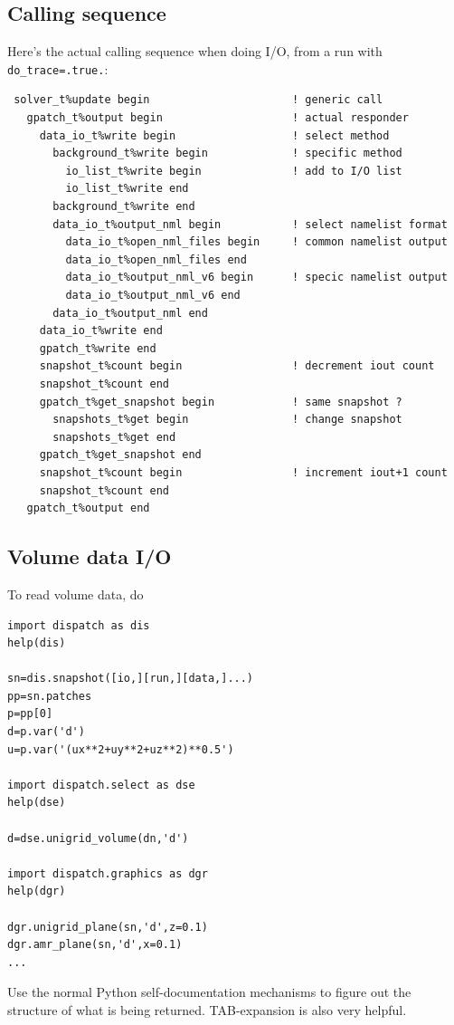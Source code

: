 \documentclass[paper=a4,fontsize=11pt]{scrartcl}
\numberwithin{equation}{section}		%
\numberwithin{figure}{section}			%
\numberwithin{table}{section}				%
\newcommand{\codecolor}{\color{Blue}}
\begin{document}
\subsection{Calling sequence}
Here's the actual calling sequence when doing I/O, from a run with \verb|do_trace=.true.|:
{\codecolor \begin{verbatim}
 solver_t%update begin                      ! generic call
   gpatch_t%output begin                    ! actual responder
     data_io_t%write begin                  ! select method
       background_t%write begin             ! specific method
         io_list_t%write begin              ! add to I/O list
         io_list_t%write end
       background_t%write end
       data_io_t%output_nml begin           ! select namelist format
         data_io_t%open_nml_files begin     ! common namelist output
         data_io_t%open_nml_files end  
         data_io_t%output_nml_v6 begin      ! specic namelist output
         data_io_t%output_nml_v6 end   
       data_io_t%output_nml end
     data_io_t%write end
     gpatch_t%write end
     snapshot_t%count begin                 ! decrement iout count
     snapshot_t%count end
     gpatch_t%get_snapshot begin            ! same snapshot ?
       snapshots_t%get begin                ! change snapshot
       snapshots_t%get end
     gpatch_t%get_snapshot end
     snapshot_t%count begin                 ! increment iout+1 count
     snapshot_t%count end
   gpatch_t%output end
\end{verbatim}}

\subsection{Volume data I/O}
To read volume data, do

{\codecolor \begin{verbatim}
import dispatch as dis
help(dis)

sn=dis.snapshot([io,][run,][data,]...)
pp=sn.patches
p=pp[0] 
d=p.var('d')
u=p.var('(ux**2+uy**2+uz**2)**0.5')

import dispatch.select as dse
help(dse)

d=dse.unigrid_volume(dn,'d')

import dispatch.graphics as dgr
help(dgr)

dgr.unigrid_plane(sn,'d',z=0.1)
dgr.amr_plane(sn,'d',x=0.1)
...
\end{verbatim}}
Use the normal Python self-documentation mechanisms to figure out the structure of what is being returned.  TAB-expansion is also very helpful.
\end{document}

